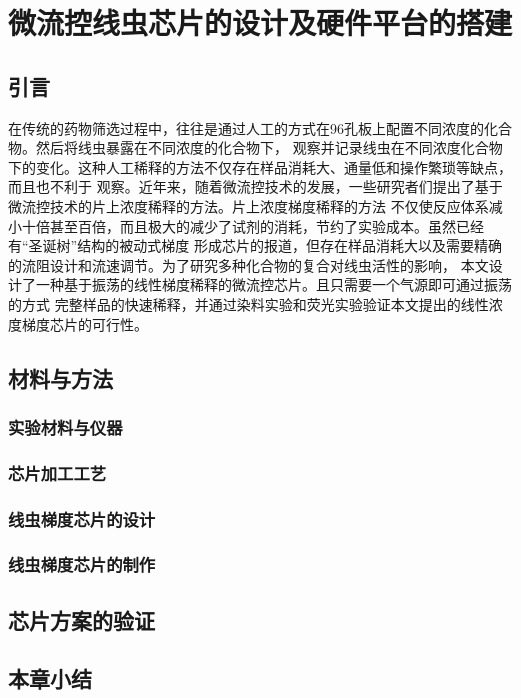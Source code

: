 \chapter{微流控线虫芯片的设计及硬件平台的搭建}
\section{引言}
	在传统的药物筛选过程中，往往是通过人工的方式在96孔板上配置不同浓度的化合物。然后将线虫暴露在不同浓度的化合物下，
	观察并记录线虫在不同浓度化合物下的变化。这种人工稀释的方法不仅存在样品消耗大、通量低和操作繁琐等缺点，而且也不利于
	观察。近年来，随着微流控技术的发展，一些研究者们提出了基于微流控技术的片上浓度稀释的方法。片上浓度梯度稀释的方法
	不仅使反应体系减小十倍甚至百倍，而且极大的减少了试剂的消耗，节约了实验成本。虽然已经有“圣诞树”结构的被动式梯度
	形成芯片的报道，但存在样品消耗大以及需要精确的流阻设计和流速调节。为了研究多种化合物的复合对线虫活性的影响，
	本文设计了一种基于振荡的线性梯度稀释的微流控芯片。且只需要一个气源即可通过振荡的方式
	完整样品的快速稀释，并通过染料实验和荧光实验验证本文提出的线性浓度梯度芯片的可行性。
	
\section{材料与方法}
\subsection{实验材料与仪器}

\subsection{芯片加工工艺}
\subsection{线虫梯度芯片的设计}
\subsection{线虫梯度芯片的制作}
\section{芯片方案的验证}
\section{本章小结}
